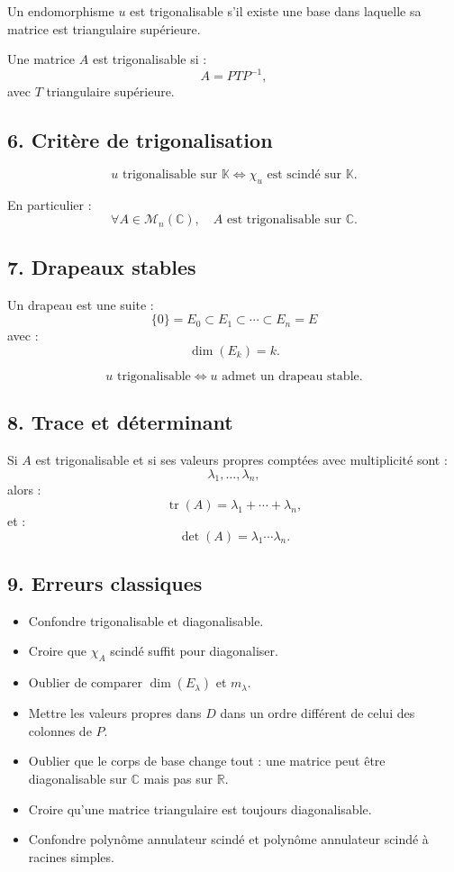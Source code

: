 \documentclass[11pt,a4paper]{article}
\newcommand{\K}{\mathbb K}
\newcommand{\R}{\mathbb R}
\newcommand{\C}{\mathbb C}
\newcommand{\M}{\mathcal M}
\newcommand{\tr}{\operatorname{tr}}
\begin{document}
Un endomorphisme \(u\) est trigonalisable s'il existe une base dans laquelle sa matrice est triangulaire supérieure.

Une matrice \(A\) est trigonalisable si :
\[
A=PTP^{-1},
\]
avec \(T\) triangulaire supérieure.

\subsection*{6. Critère de trigonalisation}

\[
u\text{ trigonalisable sur }\K
\Longleftrightarrow
\chi_u\text{ est scindé sur }\K.
\]

En particulier :
\[
\forall A\in\M_n(\C),\quad A\text{ est trigonalisable sur }\C.
\]

\subsection*{7. Drapeaux stables}

Un drapeau est une suite :
\[
\{0\}=E_0\subset E_1\subset\cdots\subset E_n=E
\]
avec :
\[
\dim(E_k)=k.
\]

\[
u\text{ trigonalisable}
\Longleftrightarrow
u\text{ admet un drapeau stable}.
\]

\subsection*{8. Trace et déterminant}

Si \(A\) est trigonalisable et si ses valeurs propres comptées avec multiplicité sont :
\[
\lambda_1,\dots,\lambda_n,
\]
alors :
\[
\tr(A)=\lambda_1+\cdots+\lambda_n,
\]
et :
\[
\det(A)=\lambda_1\cdots\lambda_n.
\]

\subsection*{9. Erreurs classiques}

\begin{itemize}
    \item Confondre trigonalisable et diagonalisable.
    \item Croire que \(\chi_A\) scindé suffit pour diagonaliser.
    \item Oublier de comparer \(\dim(E_\lambda)\) et \(m_\lambda\).
    \item Mettre les valeurs propres dans \(D\) dans un ordre différent de celui des colonnes de \(P\).
    \item Oublier que le corps de base change tout : une matrice peut être diagonalisable sur \(\C\) mais pas sur \(\R\).
    \item Croire qu'une matrice triangulaire est toujours diagonalisable.
    \item Confondre polynôme annulateur scindé et polynôme annulateur scindé à racines simples.
\end{itemize}
\end{document}
